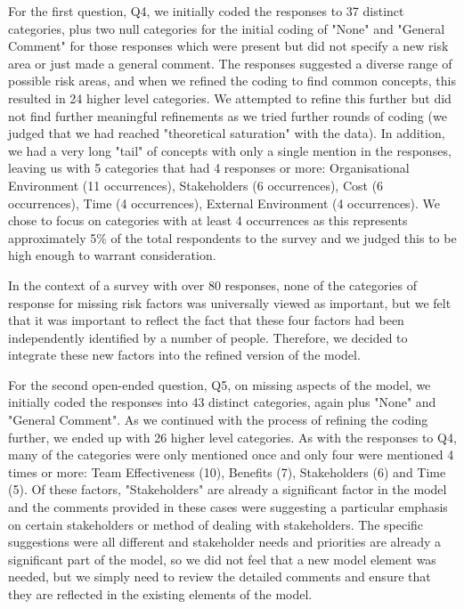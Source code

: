 For the first question, Q4, we initially coded the responses to 37 distinct categories, plus two null categories for the initial coding of "None" and "General Comment" for those responses which were present but did not specify a new risk area or just made a general comment.  The responses suggested a diverse range of possible risk areas, and when we refined the coding to find common concepts, this resulted in 24 higher level categories.  We attempted to refine this further but did not find further meaningful refinements as we tried further rounds of coding (we judged that we had reached "theoretical saturation" with the data).   In addition, we had a very long "tail" of concepts with only a single mention in the responses, leaving us with 5 categories that had 4 responses or more: Organisational Environment (11 occurrences), Stakeholders (6 occurrences), Cost (6 occurrences), Time (4 occurrences), External Environment (4 occurrences).  We chose to focus on categories with at least 4 occurrences as this represents approximately 5\% of the total respondents to the survey and we judged this to be high enough to warrant consideration.

In the context of a survey with over 80 responses, none of the categories of response for missing risk factors was universally viewed as important, but we felt that it was important to reflect the fact that these four factors had been independently identified by a number of people.  Therefore, we decided to integrate these new factors into the refined version of the model.

For the second open-ended question, Q5, on missing aspects of the model, we initially coded the responses into 43 distinct categories, again plus "None" and "General Comment".  As we continued with the process of refining the coding further, we ended up with 26 higher level categories.  As with the responses to Q4, many of the categories were only mentioned once and only four were mentioned 4 times or more: Team Effectiveness (10), Benefits (7), Stakeholders (6) and Time (5).  Of these factors, "Stakeholders" are already a significant factor in the model and the comments provided in these cases were suggesting a particular emphasis on certain stakeholders or method of dealing with stakeholders.  The specific suggestions were all different and stakeholder needs and priorities are already a significant part of the model, so we did not feel that a new model element was needed, but we simply need to review the detailed comments and ensure that they are reflected in the existing elements of the model.

